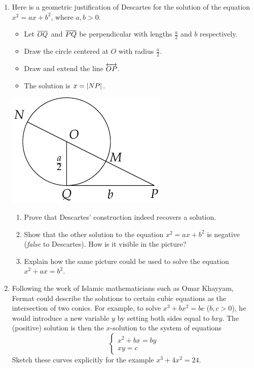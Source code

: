 \begin{exercises}{}{}
\begin{enumerate}
	  \item Here is a geometric justification of Descartes for the solution of the equation $x^2=ax+b^2$, where $a,b>0$.
	  \par
		\begin{minipage}[t]{0.6\linewidth}\vspace{-5pt}
			\begin{itemize}\itemsep0pt
			  \item Let $\overline{OQ}$ and $\overline{PQ}$ be perpendicular with lengths $\frac a2$ and $b$ respectively.
			  \item Draw the circle centered at $O$ with radius $\frac a2$.
			  \item Draw and extend the line $\overleftrightarrow{OP}$.
			  \item The solution is $x=\left| NP\right|$.
			\end{itemize}
		\end{minipage}
		\hfill
		\begin{minipage}[t]{0.35\linewidth}\vspace{-10pt}
			\includegraphics{descartes-quad}
		\end{minipage}\par\vspace{-10pt}
		\begin{enumerate}
		  \item Prove that Descartes' construction indeed recovers a solution.
	  
		  \item Show that the other solution to the equation $x^2=ax+b^2$ is negative (\emph{false} to Descartes). How is it visible in the picture?
	  	
		  \item Explain how the same picture could be used to solve the equation $x^2+ax=b^2$.
		\end{enumerate}
		
		\item Following the work of Islamic mathematicians such as Omar Khayyam, Fermat could describe the solutions to certain cubic equations as the intersection of two conics. For example, to solve $x^3+bx^2=bc$ ($b,c>0$), he would introduce a new variable $y$ by setting both sides equal to $b xy$. The (positive) solution is then the $x$-solution to the system of equations
	\[
		\begin{cases}
			x^2+bx=by\\
			xy=c
		\end{cases}
	\]
	Sketch these curves explicitly for the example $x^3+4x^2=24$.
	\end{enumerate}
\end{exercises}


